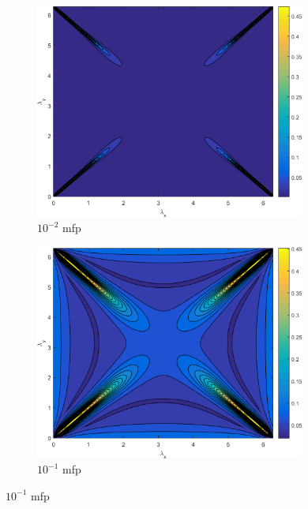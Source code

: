 \begin{figure}
\centering
	{
	\begin{subfigure}[b]{0.485\textwidth}
		\centering
		\includegraphics[width=0.975\textwidth]{figures/appendices/SI_M4S_UPWLD1_LS2_x=1e-2_dydx=1_contour.png}
		\caption{$10^{-2}$ mfp}
	\end{subfigure}
	\hfill
	\begin{subfigure}[b]{0.485\textwidth}
		\centering
		\includegraphics[width=0.975\textwidth]{figures/appendices/SI_M4S_UPWLD1_LS2_x=1e-1_dydx=1_contour.png}
		\caption{$10^{-1}$ mfp}
	\end{subfigure}
	}
	\vspace{0.5cm}

\end{figure}

